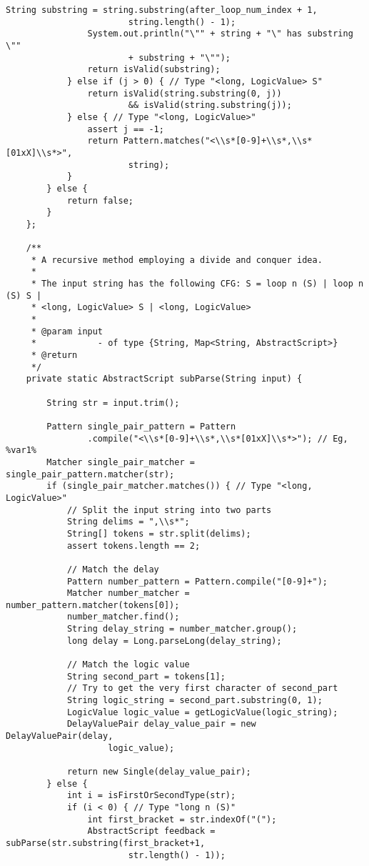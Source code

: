 \begin{lstlisting}[caption=ElementDictionary, label=listing7]
				String substring = string.substring(after_loop_num_index + 1,
						string.length() - 1);
				System.out.println("\"" + string + "\" has substring \""
						+ substring + "\"");
				return isValid(substring);
			} else if (j > 0) { // Type "<long, LogicValue> S"
				return isValid(string.substring(0, j))
						&& isValid(string.substring(j));
			} else { // Type "<long, LogicValue>"
				assert j == -1;
				return Pattern.matches("<\\s*[0-9]+\\s*,\\s*[01xX]\\s*>",
						string);
			}
		} else {
			return false;
		}
	};

	/**
	 * A recursive method employing a divide and conquer idea.
	 * 
	 * The input string has the following CFG: S = loop n (S) | loop n (S) S |
	 * <long, LogicValue> S | <long, LogicValue>
	 * 
	 * @param input
	 *            - of type {String, Map<String, AbstractScript>}
	 * @return
	 */
	private static AbstractScript subParse(String input) {

		String str = input.trim();

		Pattern single_pair_pattern = Pattern
				.compile("<\\s*[0-9]+\\s*,\\s*[01xX]\\s*>"); // Eg, %var1%
		Matcher single_pair_matcher = single_pair_pattern.matcher(str);
		if (single_pair_matcher.matches()) { // Type "<long, LogicValue>"
			// Split the input string into two parts
			String delims = ",\\s*";
			String[] tokens = str.split(delims);
			assert tokens.length == 2;

			// Match the delay
			Pattern number_pattern = Pattern.compile("[0-9]+");
			Matcher number_matcher = number_pattern.matcher(tokens[0]);
			number_matcher.find();
			String delay_string = number_matcher.group();
			long delay = Long.parseLong(delay_string);

			// Match the logic value
			String second_part = tokens[1];
			// Try to get the very first character of second_part
			String logic_string = second_part.substring(0, 1);
			LogicValue logic_value = getLogicValue(logic_string);
			DelayValuePair delay_value_pair = new DelayValuePair(delay,
					logic_value);

			return new Single(delay_value_pair);
		} else {
			int i = isFirstOrSecondType(str);
			if (i < 0) { // Type "long n (S)"
				int first_bracket = str.indexOf("(");
				AbstractScript feedback = subParse(str.substring(first_bracket+1,
						str.length() - 1));


\end{lstlisting}
